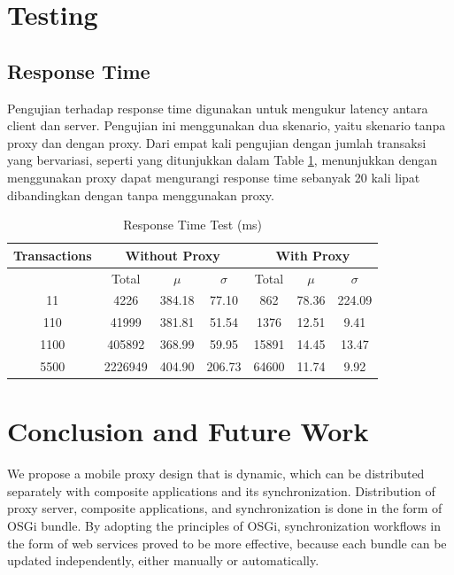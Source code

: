 \documentclass[conference]{IEEEtran}
\begin{document}




\section{Testing}
\subsection{Response Time}
Pengujian terhadap response time digunakan untuk mengukur latency antara client dan server. Pengujian ini menggunakan dua skenario, yaitu skenario tanpa proxy dan dengan proxy. Dari empat kali pengujian dengan jumlah transaksi yang bervariasi, seperti yang ditunjukkan dalam Table \ref{tbl:response_time}, menunjukkan dengan menggunakan proxy dapat mengurangi response time sebanyak 20 kali lipat dibandingkan dengan tanpa menggunakan proxy.


\begin{table}
\renewcommand{\arraystretch}{1.3}
\caption{Response Time Test (ms)}
\label{tbl:response_time}
\centering
\begin{tabular}{|c||c|c|c|c|c|c|}
\hline
Transactions & \multicolumn{3}{c|}{Without Proxy} & \multicolumn{3}{c|}{With Proxy}\\
\hline
& Total & $\mu$ & $\sigma$ & Total & $\mu$ & $\sigma$\\
\hline
11 & 4226 & 384.18 & 77.10 & 862 & 78.36 & 224.09\\
\hline
110 & 41999 & 381.81 & 51.54 & 1376 & 12.51 & 9.41\\
\hline
1100 & 405892 & 368.99 & 59.95 & 15891 & 14.45 & 13.47\\
\hline
5500 & 2226949 & 404.90 & 206.73 & 64600 & 11.74 & 9.92\\
\hline
\end{tabular}
\end{table}




\section{Conclusion and Future Work}
We propose a mobile proxy design that is dynamic, which can be distributed separately with composite applications and its synchronization. Distribution of proxy server, composite applications, and synchronization is done in the form of OSGi bundle. By adopting the principles of OSGi, synchronization workflows in the form of web services proved to be more effective, because each bundle can be updated independently, either manually or automatically.
\end{document}
